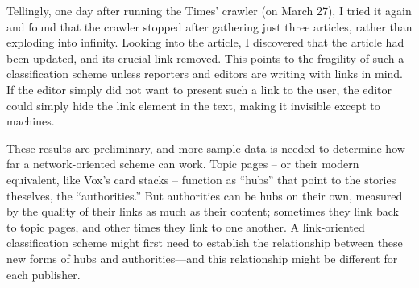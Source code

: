Tellingly, one day after running the Times' crawler (on March 27), I tried it again and found that the crawler stopped after gathering just three articles, rather than exploding into infinity. Looking into the article, I discovered that the article had been updated, and its crucial link removed. This points to the fragility of such a classification scheme unless reporters and editors are writing with links in mind. If the editor simply did not want to present such a link to the user, the editor could simply hide the link element in the text, making it invisible except to machines.

These results are preliminary, and more sample data is needed to determine how far a network-oriented scheme can work. Topic pages -- or their modern equivalent, like Vox's card stacks -- function as ``hubs'' that point to the stories theselves, the ``authorities.'' But authorities can be hubs on their own, measured by the quality of their links as much as their content; sometimes they link back to topic pages, and other times they link to one another. A link-oriented classification scheme might first need to establish the relationship between these new forms of hubs and authorities---and this relationship might be different for each publisher.











